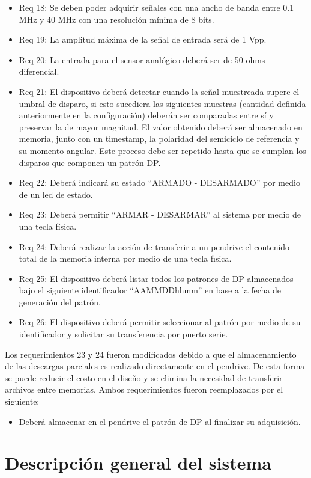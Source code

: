 \begin{itemize}
\item Req 18: Se deben poder adquirir señales con una ancho de banda entre 0.1 MHz y 40 MHz con una resolución mínima de 8 bits.
\item Req 19: La amplitud máxima de la señal de entrada será de 1 Vpp.
\item Req 20: La entrada para el sensor analógico deberá ser de 50 ohms diferencial.
\item Req 21: El dispositivo deberá detectar cuando la señal muestreada supere el umbral de disparo, si esto sucediera las siguientes muestras (cantidad definida anteriormente en la configuración) deberán ser comparadas entre sí y preservar la de mayor magnitud. El valor obtenido deberá ser almacenado en memoria, junto con un timestamp, la polaridad del semiciclo de referencia y su momento angular. Este proceso debe ser repetido hasta que se cumplan los disparos que componen un patrón DP.
\item Req 22: Deberá indicará su estado “ARMADO - DESARMADO” por medio de un led de estado.
\item Req 23: Deberá permitir “ARMAR - DESARMAR” al sistema por medio de una tecla física.
\item Req 24: Deberá realizar la acción de transferir a un pendrive el contenido total de la memoria interna por medio de una tecla fısica.
\item Req 25: El dispositivo deberá listar todos los patrones de DP almacenados bajo el siguiente identificador “AAMMDDhhmm” en base a la fecha de generación del patrón.
\item Req 26: El dispositivo deberá permitir seleccionar al patrón por medio de su identificador y solicitar su transferencia por puerto serie.
\end{itemize}

Los requerimientos 23 y 24 fueron modificados debido a que el almacenamiento de las descargas parciales es realizado directamente en el pendrive. De esta forma se puede reducir el costo en el diseño y se elimina la necesidad de transferir archivos entre memorias. Ambos requerimientos fueron reemplazados por el siguiente:
\begin{itemize}
\item Deberá almacenar en el pendrive el patrón de DP al finalizar su adquisición.
\end{itemize}


\section{Descripción general del sistema}

